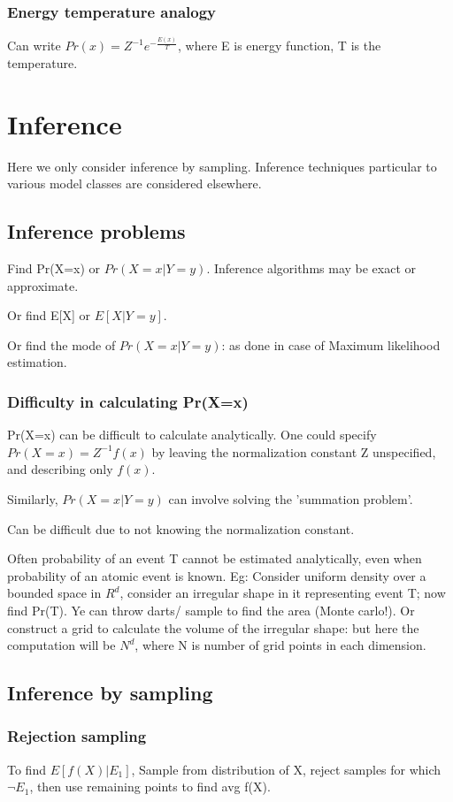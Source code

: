 \documentclass[oneside, article]{memoir}
\begin{document}
\subsection{Energy temperature analogy}
Can write $Pr(x) = Z^{-1}e^{-\frac{E(x)}{T}}$, where E is energy function, T is the temperature. \tbc

\chapter{Inference}
Here we only consider inference by sampling. Inference techniques particular to various model classes are considered elsewhere.

\section{Inference problems}
Find Pr(X=x) or $Pr(X=x|Y=y)$. Inference algorithms may be exact or approximate.

Or find E[X] or $E[X|Y=y]$.

Or find the mode of $Pr(X=x|Y=y)$: as done in case of Maximum likelihood estimation.

\subsection{Difficulty in calculating Pr(X=x)}
Pr(X=x) can be difficult to calculate analytically. One could specify $Pr(X=x) = Z^{-1}f(x)$ by leaving the normalization constant Z unspecified, and describing only $f(x)$.

Similarly, $Pr(X=x|Y=y)$ can involve solving the 'summation problem'.

Can be difficult due to not knowing the normalization constant.

Often probability of an event T cannot be estimated analytically, even when probability of an atomic event is known. Eg: Consider uniform density over a bounded space in $R^{d}$, consider an irregular shape in it representing event T; now find Pr(T). Ye can throw darts/ sample to find the area (Monte carlo!). Or construct a grid to calculate the volume of the irregular shape: but here the computation will be $N^{d}$, where N is number of grid points in each dimension.

\section{Inference by sampling}
\subsection{Rejection sampling}
To find $E[f(X)|E_1]$, Sample from distribution of X, reject samples for which $\lnot E_1$, then use remaining points to find avg f(X).
\end{document}
